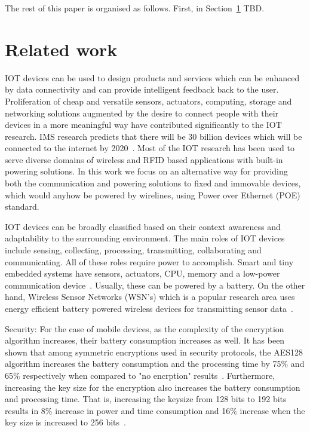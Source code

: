 \documentclass[draft,a4paper]{siamltex}
\begin{document}
The rest of this paper is organised as follows.  First, in
Section~\ref{sec:related} TBD.
 

\section{Related work}
\label{sec:related}

IOT devices can be used to design products and services which can be enhanced by
data connectivity and can provide intelligent feedback back to the user.
Proliferation of cheap and versatile sensors, actuators, computing, storage and
networking solutions augmented by the desire to connect people with their
devices in a more meaningful way have contributed significantly to the IOT
research. IMS research predicts that there will be 30 billion devices which will
be connected to the internet by 2020~\cite{ABIresearch}. Most of the IOT
research has been used to serve diverse domains of wireless and RFID based
applications with built-in powering solutions. In this work we focus on an
alternative way for providing both the communication and powering solutions to
fixed and immovable devices, which would anyhow be powered by wirelines, using
Power over Ethernet (POE) standard.

IOT devices can be broadly classified based on their context awareness and
adaptability to the surrounding environment. The main roles of IOT devices
include sensing, collecting, processing, transmitting, collaborating and
communicating. All of these roles require power to accomplish. Smart and tiny
embedded systems have sensors, actuators, CPU, memory and a low-power
communication device~\cite{lopez2012adding}. Usually, these can be powered by a
battery. On the other hand, Wireless Sensor Networks (WSN's) which is a popular
research area uses energy efficient battery powered wireless devices for
transmitting sensor data~\cite{akyildiz2002wireless}.

Security:
For the case of mobile devices, as the complexity of the encryption algorithm
increases, their battery consumption increases as well. It has been shown that
among symmetric encryptions used in security protocols, the AES128 algorithm
increases the battery consumption and the processing time by 75\% and 65\%
respectively when compared to "no encrption" results~\cite{hamad2009energy}.
Furthermore, increasing the key size for the encryption also increases the
battery consumption and processing time. That is, increasing the keysize from
128 bits to 192 bits results in 8\% increase in power and time consumption and
16\% increase when the key size is increased to 256 bits~\cite{hamad2009energy}. 
\end{document}
